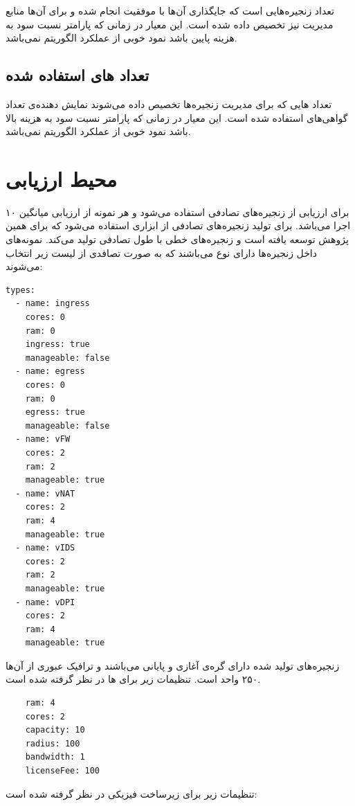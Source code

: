 تعداد زنجیره‌هایی است که جایگذاری آن‌ها با موفقیت انجام شده و برای آن‌ها منابع مدیریت نیز تخصیص داده شده است. این معیار در زمانی که پارامتر نسبت سود به هزینه پایین باشد نمود خوبی از عملکرد الگوریتم نمی‌باشد.

\subsection{تعداد های استفاده شده}

تعداد هایی که برای مدیریت زنجیره‌ها تخصیص داده می‌شوند نمایش دهنده‌ی تعداد گواهی‌های استفاده شده است.
این معیار در زمانی که پارامتر نسبت سود به هزینه بالا باشد نمود خوبی از عملکرد الگوریتم نمی‌باشد.

\section{محیط ارزیابی}

برای ارزیابی از زنجیره‌های تصادفی استفاده می‌شود و هر نمونه از ارزیابی میانگین ۱۰ اجرا می‌باشد.
برای تولید زنجیره‌های تصادفی از ابزاری استفاده می‌شود که برای همین پژوهش توسعه یافته است و زنجیره‌های خطی با طول تصادفی تولید می‌کند.
نمونه‌های داخل زنجیره‌ها دارای نوع می‌باشند که به صورت تصافدی از لیست زیر انتخاب می‌شوند:

\begin{latin}
    \begin{verbatim}
types:
  - name: ingress
    cores: 0
    ram: 0
    ingress: true
    manageable: false
  - name: egress
    cores: 0
    ram: 0
    egress: true
    manageable: false
  - name: vFW
    cores: 2
    ram: 2
    manageable: true
  - name: vNAT
    cores: 2
    ram: 4
    manageable: true
  - name: vIDS
    cores: 2
    ram: 2
    manageable: true
  - name: vDPI
    cores: 2
    ram: 4
    manageable: true
    \end{verbatim}
\end{latin}

زنجیره‌های تولید شده دارای گره‌ی آغازی و پایانی می‌باشند
و ترافیک عبوری از آن‌ها ۲۵۰ واحد است.
تنظیمات زیر برای ها در نظر گرفته شده است.

\begin{latin}
    \begin{verbatim}
    ram: 4
    cores: 2
    capacity: 10
    radius: 100
    bandwidth: 1
    licenseFee: 100
    \end{verbatim}
\end{latin}

تنظیمات زیر برای زیرساخت فیزیکی در نظر گرفته شده است:


